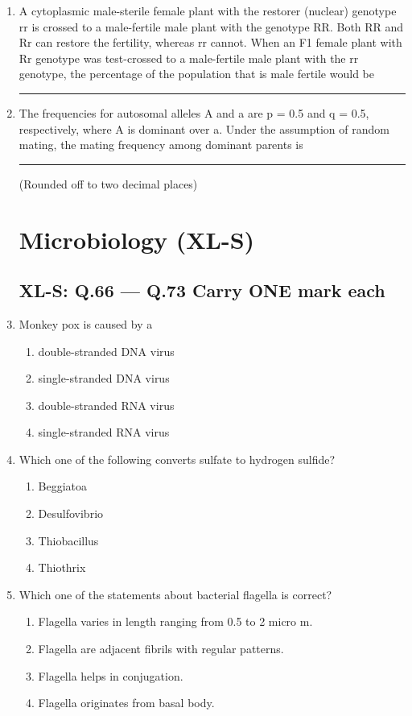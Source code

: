 \documentclass[journal,12pt,onecolumn]{IEEEtran}
\begin{document}
\begin{enumerate}
    \item A cytoplasmic male-sterile female plant with the restorer (nuclear) genotype rr is crossed to a male-fertile male plant with the genotype RR. Both RR and Rr can restore the fertility, whereas rr cannot. When an F1 female plant with Rr genotype was test-crossed to a male-fertile male plant with the rr genotype, the percentage of the population that is male fertile would be \rule{1 cm}{0.15 mm} %

    \item The frequencies for autosomal alleles A and a are p = 0.5 and q = 0.5, respectively, where A is dominant over a. Under the assumption of random mating, the mating frequency among dominant parents is \rule{1 cm}{0.15 mm} (Rounded off to two decimal places)

\section*{Microbiology (XL-S)}
\subsection*{XL-S: Q.66 --- Q.73 Carry ONE mark each}

    \item Monkey pox is caused by a
    \begin{enumerate}
        \item double-stranded DNA virus
        \item single-stranded DNA virus
        \item double-stranded RNA virus
        \item single-stranded RNA virus
    \end{enumerate}

    \item Which one of the following converts sulfate to hydrogen sulfide?
    \begin{enumerate}
        \item Beggiatoa
        \item Desulfovibrio
        \item Thiobacillus
        \item Thiothrix
    \end{enumerate}

    \item Which one of the statements about bacterial flagella is correct?
    \begin{enumerate}
        \item Flagella varies in length ranging from 0.5 to 2 micro m.
        \item Flagella are adjacent fibrils with regular patterns.
        \item Flagella helps in conjugation.
        \item Flagella originates from basal body.
    \end{enumerate}


\end{enumerate}
\end{document}
